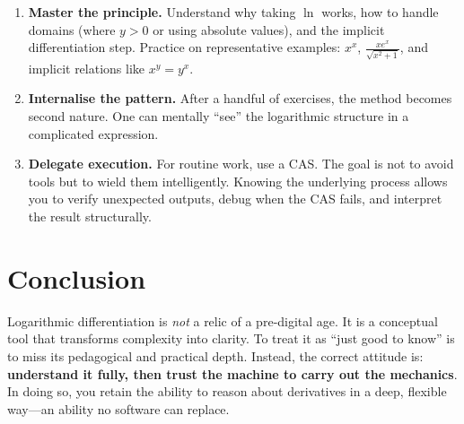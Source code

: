 \documentclass[12pt]{article}
\begin{document}
\begin{enumerate}
\item \textbf{Master the principle.} Understand why taking \(\ln\) works, how to handle domains (where \(y>0\) or using absolute values), and the implicit differentiation step. Practice on representative examples: \(x^x\), \(\frac{x e^x}{\sqrt{x^2+1}}\), and implicit relations like \(x^y = y^x\).
\item \textbf{Internalise the pattern.} After a handful of exercises, the method becomes second nature. One can mentally ``see'' the logarithmic structure in a complicated expression.
\item \textbf{Delegate execution.} For routine work, use a CAS. The goal is not to avoid tools but to wield them intelligently. Knowing the underlying process allows you to verify unexpected outputs, debug when the CAS fails, and interpret the result structurally.
\end{enumerate}

\section*{Conclusion}

Logarithmic differentiation is \emph{not} a relic of a pre‑digital age. It is a conceptual tool that transforms complexity into clarity. To treat it as ``just good to know'' is to miss its pedagogical and practical depth. Instead, the correct attitude is: \textbf{understand it fully, then trust the machine to carry out the mechanics}. In doing so, you retain the ability to reason about derivatives in a deep, flexible way—an ability no software can replace.
\end{document}
